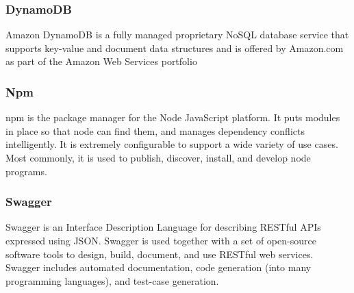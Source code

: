\subsubsection{DynamoDB}
Amazon DynamoDB is a fully managed proprietary NoSQL database service that supports key-value and document data structures and is offered by Amazon.com as part of the Amazon Web Services portfolio
\subsubsection{Npm}
npm is the package manager for the Node JavaScript platform. It puts modules in place so that node can find them, and manages dependency conflicts intelligently.
It is extremely configurable to support a wide variety of use cases. Most commonly, it is used to publish, discover, install, and develop node programs.
\subsubsection{Swagger}
Swagger is an Interface Description Language for describing RESTful APIs expressed using JSON. Swagger is used together with a set of open-source software tools to design, build, document, and use RESTful web services. Swagger includes automated documentation, code generation (into many programming languages), and test-case generation.


